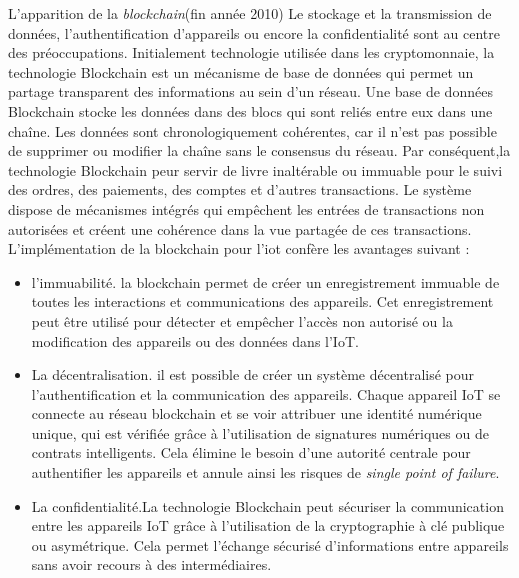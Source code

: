 L'apparition de la \textit{blockchain}(fin année 2010)
Le stockage et la transmission de données, l'authentification d'appareils ou encore la confidentialité sont au centre des préoccupations. Initialement technologie utilisée dans les cryptomonnaie, la technologie Blockchain est un mécanisme de base de données qui permet un partage transparent des informations au sein d'un réseau. Une base de données Blockchain stocke les données dans des blocs qui sont reliés entre eux dans une chaîne. Les données sont chronologiquement cohérentes, car il n'est pas possible de supprimer ou modifier la chaîne sans le consensus du réseau. Par conséquent,la technologie Blockchain peur servir de livre inaltérable ou immuable pour le suivi des ordres, des paiements, des comptes et d'autres transactions. Le système dispose de mécanismes intégrés qui empêchent les entrées de transactions non autorisées et créent une cohérence dans la vue partagée de ces transactions. L'implémentation de la blockchain pour l'iot confère les avantages suivant : 
\begin{itemize}
\item l'immuabilité. la blockchain permet de créer un enregistrement immuable de toutes les interactions et communications des appareils. Cet enregistrement peut être utilisé pour détecter et empêcher l'accès non autorisé ou la modification des appareils ou des données dans l'IoT.
\item La décentralisation. il est possible de créer un système décentralisé pour l’authentification et la communication des appareils. Chaque appareil IoT se connecte au réseau blockchain et se voir attribuer une identité numérique unique, qui est vérifiée grâce à l'utilisation de signatures numériques ou de contrats intelligents. Cela élimine le besoin d’une autorité centrale pour authentifier les appareils et annule ainsi les risques de \textit{single point of failure}.
\item La confidentialité.La technologie Blockchain peut sécuriser la communication entre les appareils IoT grâce à l'utilisation de la cryptographie à clé publique ou asymétrique. Cela permet l’échange sécurisé d’informations entre appareils sans avoir recours à des intermédiaires.
\end{itemize}

